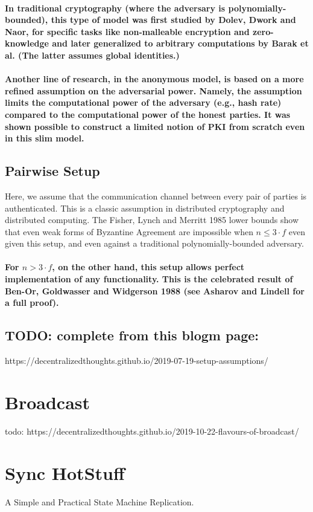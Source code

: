 \paragraph{In traditional cryptography (where the adversary is polynomially-bounded),
this type of model was first studied by Dolev, Dwork and Naor, for
specific tasks like non-malleable encryption and zero-knowledge and
later generalized to arbitrary computations by Barak et al. (The latter
assumes global identities.)}

\paragraph{Another line of research, in the anonymous model, is based on a more
refined assumption on the adversarial power. Namely, the assumption
limits the computational power of the adversary (e.g., hash rate)
compared to the computational power of the honest parties. It was
shown possible to construct a limited notion of PKI from scratch even
in this slim model. }

\subsection{Pairwise Setup}

Here, we assume that the communication channel between every pair
of parties is authenticated. This is a classic assumption in distributed
cryptography and distributed computing. The Fisher, Lynch and Merritt
1985 lower bounds show that even weak forms of Byzantine Agreement
are impossible when $n\le3\cdot f$ even given this setup, and even
against a traditional polynomially-bounded adversary.

\paragraph{For $n>3\cdot f$, on the other hand, this setup allows perfect implementation
of any functionality. This is the celebrated result of Ben-Or, Goldwasser
and Widgerson 1988 (see Asharov and Lindell for a full proof).}

\subsection{TODO: complete from this blogm page: }

https://decentralizedthoughts.github.io/2019-07-19-setup-assumptions/

\section{Broadcast}

todo: https://decentralizedthoughts.github.io/2019-10-22-flavours-of-broadcast/

\section{Sync HotStuff}

A Simple and Practical State Machine Replication.
